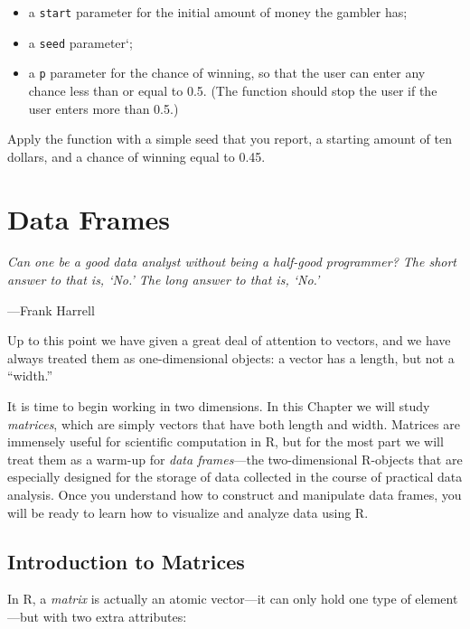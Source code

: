 \documentclass[]{book}
\providecommand{\tightlist}{%
  \setlength{\itemsep}{0pt}\setlength{\parskip}{0pt}}
\theoremstyle{definition}
\theoremstyle{definition}
\theoremstyle{definition}
\theoremstyle{remark}
\let\BeginKnitrBlock\begin \let\EndKnitrBlock\end
\begin{document}
{\begin{enumerate}
  \begin{itemize}
  \tightlist
  \item
    a \texttt{start} parameter for the initial amount of money the
    gambler has;
  \item
    a \texttt{seed} parameter`;
  \item
    a \texttt{p} parameter for the chance of winning, so that the user
    can enter any chance less than or equal to 0.5. (The function should
    stop the user if the user enters more than 0.5.)
  \end{itemize}

  Apply the function with a simple seed that you report, a starting
  amount of ten dollars, and a chance of winning equal to 0.45.
\end{enumerate}

\chapter{Data Frames}\label{frames}

\BeginKnitrBlock{leadquote}
\emph{Can one be a good data analyst without being a half-good
programmer? The short answer to that is, `No.' The long answer to that
is, `No.'}

---Frank Harrell
\EndKnitrBlock{leadquote}

Up to this point we have given a great deal of attention to vectors, and
we have always treated them as one-dimensional objects: a vector has a
length, but not a ``width.''

It is time to begin working in two dimensions. In this Chapter we will
study \emph{matrices}, which are simply vectors that have both length
and width. Matrices are immensely useful for scientific computation in
R, but for the most part we will treat them as a warm-up for \emph{data
frames}---the two-dimensional R-objects that are especially designed for
the storage of data collected in the course of practical data analysis.
Once you understand how to construct and manipulate data frames, you
will be ready to learn how to visualize and analyze data using R.

\newpage

\section{Introduction to Matrices}\label{introduction-to-matrices}

In R, a \emph{matrix}  is actually an atomic vector---it
can only hold one type of element---but with two extra attributes:

}
\end{document}
